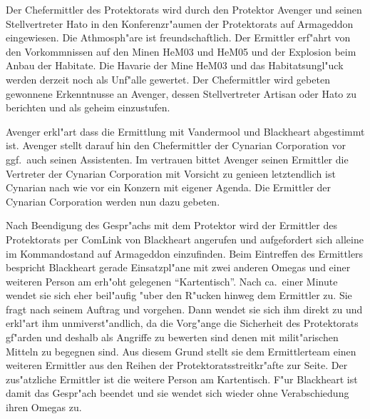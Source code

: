 Der Chefermittler des Protektorats wird durch den Protektor Avenger und seinen Stellvertreter Hato in den Konferenzr"aumen der Protektorats auf Armageddon eingewiesen. Die Athmosph"are ist freundschaftlich. Der Ermittler erf"ahrt von den Vorkommnissen auf den Minen HeM03 und HeM05 und der Explosion beim Anbau der Habitate. Die Havarie der Mine HeM03 und das Habitatsungl"uck werden derzeit noch als Unf"alle gewertet. Der Chefermittler wird gebeten gewonnene Erkenntnusse an Avenger, dessen Stellvertreter Artisan oder Hato zu berichten und als geheim einzustufen.

Avenger erkl"art dass die Ermittlung mit Vandermool und Blackheart abgestimmt ist. Avenger stellt darauf hin den Chefermittler der Cynarian Corporation vor ggf.~auch seinen Assistenten. Im vertrauen bittet Avenger seinen Ermittler die Vertreter der Cynarian Corporation mit Vorsicht zu genie\3en letztendlich ist Cynarian nach wie vor ein Konzern mit eigener Agenda. Die Ermittler der Cynarian Corporation werden nun dazu gebeten.

Nach Beendigung des Gespr"achs mit dem Protektor wird der Ermittler des Protektorats per ComLink von Blackheart angerufen und aufgefordert sich alleine im Kommandostand auf Armageddon einzufinden. Beim Eintreffen des Ermittlers bespricht Blackheart gerade Einsatzpl"ane mit zwei anderen Omegas und einer weiteren Person am erh"oht gelegenen ``Kartentisch''. Nach ca.~einer Minute  wendet sie sich eher beil"aufig "uber den R"ucken hinweg dem Ermittler zu. Sie fragt nach seinem Auftrag und vorgehen. Dann wendet sie sich ihm direkt zu und erkl"art ihm unmi\3verst"andlich, da\3 die Vorg"ange die Sicherheit des Protektorats gf"arden und deshalb als Angriffe zu bewerten sind denen mit milit"arischen Mitteln zu begegnen sind. Aus diesem Grund stellt sie dem Ermittlerteam einen weiteren Ermittler aus den Reihen der Protektoratsstreitkr"afte zur Seite. Der zus"atzliche Ermittler ist die weitere Person am Kartentisch. F"ur Blackheart ist damit das Gespr"ach beendet und sie wendet sich wieder ohne Verabschiedung ihren Omegas zu.

